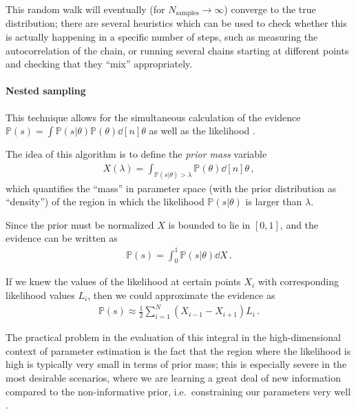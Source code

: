 \documentclass[main.tex]{subfiles}
\begin{document}
This random walk will eventually (for \(N _{\text{samples}} \to \infty \)) converge to the true distribution; there are several heuristics which can be used to check whether this is actually happening in a specific number of steps, such as measuring the autocorrelation of the chain, or running several chains starting at different points and checking that they ``mix'' appropriately. 

\paragraph{Nested sampling}

This technique allows for the simultaneous calculation of the evidence \(\mathbb{P}(s) = \int \mathbb{P}(s|\theta) \mathbb{P}(\theta ) \dd[n]{\theta }\) as well as the likelihood \cites{skillingNestedSamplingGeneral2006}{siviaDataAnalysisBayesian2006}[app.\ B]{breschiTtBajesBayesian2021}{betancourtNestedSamplingConstrained2011}.

The idea of this algorithm is to define the \emph{prior mass} variable 
%
\begin{align}
X(\lambda ) = \int_{\mathbb{P}(s | \theta) > \lambda } \mathbb{P}(\theta) \dd[n]{\theta }
\,,
\end{align}
%
which quantifies the ``mass'' in parameter space (with the prior distribution as ``density'') of the region in which the likelihood \(\mathbb{P}(s | \theta )\) is larger than \(\lambda \). 

Since the prior must be normalized \(X\) is bounded to lie in \([0, 1]\), and the evidence can be written as 
%
\begin{align}
\mathbb{P}(s) = \int_{0}^{1} \mathbb{P}(s | \theta ) \dd{X}
\,.
\end{align}

If we knew the values of the likelihood at certain points \(X_i\) with corresponding likelihood values \(L_i\), then we could approximate the evidence as 
%
\begin{align}
\mathbb{P}(s) \approx \frac{1}{2} \sum _{i=1}^{N} (X_{i-1} - X_{i+1}) L_i
\,.
\end{align}

The practical problem in the evaluation of this integral in the high-dimensional context of parameter estimation is the fact that the region where the likelihood is high is typically very small in terms of prior mass; this is especially severe in the most desirable scenarios, where we are learning a great deal of new information compared to the non-informative prior, i.e.\ constraining our parameters very well \cite[sec.\ 4]{skillingNestedSamplingGeneral2006}.
\end{document}
